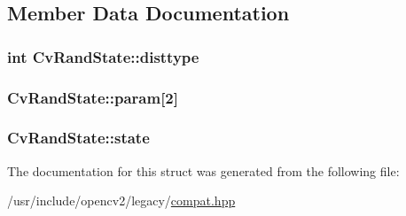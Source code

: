 \subsection{Member Data Documentation}
\hypertarget{structCvRandState_a250e3c9f5ba28d74aae2d21fbc13c812}{
\subsubsection[{disttype}]{\setlength{\rightskip}{0pt plus 5cm}int Cv\-Rand\-State\-::disttype}}\label{structCvRandState_a250e3c9f5ba28d74aae2d21fbc13c812}
\hypertarget{structCvRandState_a57bd1e6afb134d7450af354cc1abd810}{
\subsubsection[{param}]{ Cv\-Rand\-State\-::param\mbox{[}2\mbox{]}}}\label{structCvRandState_a57bd1e6afb134d7450af354cc1abd810}
\hypertarget{structCvRandState_a564c167b31ca5d5f3bb574d23127fcb5}{
\subsubsection[{state}]{ Cv\-Rand\-State\-::state}}\label{structCvRandState_a564c167b31ca5d5f3bb574d23127fcb5}


The documentation for this struct was generated from the following file\-:\begin{DoxyCompactItemize}
\item 
/usr/include/opencv2/legacy/\hyperlink{compat_8hpp}{compat.\-hpp}\end{DoxyCompactItemize}
